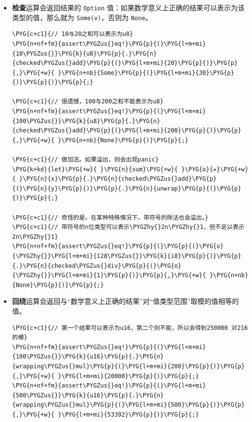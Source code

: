 \begin{itemize}
\item \textbf{检查}运算会返回结果的 \texttt{Option} 值：如果数学意义上正确的结果可以表示为该类型的值，那么就为 \texttt{Some(v)}，否则为 \texttt{None}。

\begin{Verbatim}[commandchars=\\\{\},breaklines=true,breakanywhere=true,fontsize=\codefont,xleftmargin=17bp]
\PYG{c+c1}{// 10与20之和可以表示为u8}
\PYG{n+nf+fm}{assert\PYGZus{}eq!}\PYG{p}{(}\PYG{l+m+mi}{10\PYGZus{}}\PYG{k}{u8}\PYG{p}{.}\PYG{n}{checked\PYGZus{}add}\PYG{p}{(}\PYG{l+m+mi}{20}\PYG{p}{)}\PYG{p}{,}\PYG{+w}{ }\PYG{n+nb}{Some}\PYG{p}{(}\PYG{l+m+mi}{30}\PYG{p}{)}\PYG{p}{)}\PYG{p}{;}

\PYG{c+c1}{// 很遗憾，100与200之和不能表示为u8}
\PYG{n+nf+fm}{assert\PYGZus{}eq!}\PYG{p}{(}\PYG{l+m+mi}{100\PYGZus{}}\PYG{k}{u8}\PYG{p}{.}\PYG{n}{checked\PYGZus{}add}\PYG{p}{(}\PYG{l+m+mi}{200}\PYG{p}{)}\PYG{p}{,}\PYG{+w}{ }\PYG{n+nb}{None}\PYG{p}{)}\PYG{p}{;}

\PYG{c+c1}{// 做加法。如果溢出，则会出现panic}
\PYG{k+kd}{let}\PYG{+w}{ }\PYG{n}{sum}\PYG{+w}{ }\PYG{o}{=}\PYG{+w}{ }\PYG{n}{x}\PYG{p}{.}\PYG{n}{checked\PYGZus{}add}\PYG{p}{(}\PYG{n}{y}\PYG{p}{)}\PYG{p}{.}\PYG{n}{unwrap}\PYG{p}{(}\PYG{p}{)}\PYG{p}{;}

\PYG{c+c1}{// 奇怪的是，在某种特殊情况下，带符号的除法也会溢出。}
\PYG{c+c1}{// 带符号的n位类型可以表示\PYGZhy{}2n\PYGZhy{}1，但不足以表示2n\PYGZhy{}1}
\PYG{n+nf+fm}{assert\PYGZus{}eq!}\PYG{p}{(}\PYG{p}{(}\PYG{o}{\PYGZhy{}}\PYG{l+m+mi}{128\PYGZus{}}\PYG{k}{i8}\PYG{p}{)}\PYG{p}{.}\PYG{n}{checked\PYGZus{}div}\PYG{p}{(}\PYG{o}{\PYGZhy{}}\PYG{l+m+mi}{1}\PYG{p}{)}\PYG{p}{,}\PYG{+w}{ }\PYG{n+nb}{None}\PYG{p}{)}\PYG{p}{;}
\end{Verbatim}

\item \textbf{回绕}运算会返回与“数学意义上正确的结果”对“值类型范围”取模的值相等的值。

\begin{Verbatim}[commandchars=\\\{\},breaklines=true,breakanywhere=true,fontsize=\codefont,xleftmargin=17bp]
\PYG{c+c1}{// 第一个结果可以表示为u16，第二个则不能，所以会得到250000 对216的模}
\PYG{n+nf+fm}{assert\PYGZus{}eq!}\PYG{p}{(}\PYG{l+m+mi}{100\PYGZus{}}\PYG{k}{u16}\PYG{p}{.}\PYG{n}{wrapping\PYGZus{}mul}\PYG{p}{(}\PYG{l+m+mi}{200}\PYG{p}{)}\PYG{p}{,}\PYG{+w}{ }\PYG{l+m+mi}{20000}\PYG{p}{)}\PYG{p}{;}
\PYG{n+nf+fm}{assert\PYGZus{}eq!}\PYG{p}{(}\PYG{l+m+mi}{500\PYGZus{}}\PYG{k}{u16}\PYG{p}{.}\PYG{n}{wrapping\PYGZus{}mul}\PYG{p}{(}\PYG{l+m+mi}{500}\PYG{p}{)}\PYG{p}{,}\PYG{+w}{ }\PYG{l+m+mi}{53392}\PYG{p}{)}\PYG{p}{;}


\end{Verbatim}
\end{itemize}
